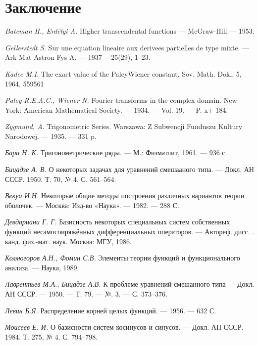 ﻿\documentclass[oneside, final, 14pt]{extreport}
\begin{document}
	
\chapter*{Заключение}
	
\begin{thebibliography}{30}

	{\it Bateman H., Erd{\'e}lyi A.} Higher transcendental functions — 
	McGraw-Hill — 1953.
	
	{\it Gellerstedt S.} Sur une equation lineaire aux derivees partielles de type mixte. — 
	Ark Mat Astron Fys A. — 1937 —25(29), 1–23. 

	{\it Kadec M.I.} The exact value of the PaleyWiener constant, 
	Sov. Math. Dokl. 5, 1964, 559561

	{\it Paley R.E.A.C., Wiener N.} Fourier transforms in the complex domain. 
	New York: American Mathematical Society. — 1934. — Vol. 19. — P. x+ 184.
	
	{\it Zygmund, A.} Trigonometric Series. 
		Warszawa: Z Subwencji Funduszu Kultury Narodowej. — 1935. — 331 p.
	
	{\it Бари Н. К.} Тригонометрические ряды. —
	М.: Физматлит, 1961. — 936 с.
	
	{\it Бицадзе А. В. } О некоторых задачах для уравнений смешааного типа. —
	Докл. АН СССР. 1950. Т. 70, № 4. С. 561–564.
	
	{\it Векуа И.Н.} Некоторые общие методы построения различных вариантов теории оболочек. — 
	Москва: Изд-во «Наука». — 1982. — 288 С.
	
	{\it Девдариани Г. Г.} Базисность некоторых специальных систем собственных функций несамосоиряжённых дифференциальных операторов. —
	Автореф. дисс. . канд. физ.-мат. наук. Москва: МГУ, 1986.
	
	{\it Колмогоров А.Н., Фомин С.В.} Элементы теории функций и функционального анализа. —
	Наука, 1989.
	
	{\it Лаврентьев М.А., Бицадзе А.В.} К проблеме уравнений смешанного типа — 
	Докл. АН СССР. — 1950. — Т. 79. — №. 3. — С. 373–376.

	{\it Левин Б.Я.} Распределение корней целых функций. — 1956. — 632 С.
	
	{\it Моисеев Е. И.} О базисности систем косинусов и синусов. —
	Докл. АН СССР. 1984. Т. 275, № 4. С. 794–798.
	

\end{thebibliography}
\end{document}
